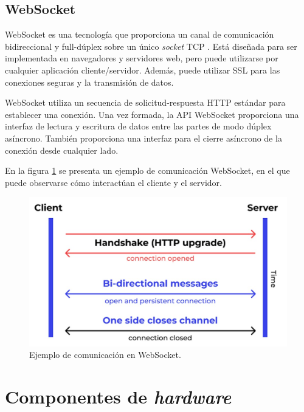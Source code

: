 \subsection{WebSocket}

WebSocket es una tecnología que proporciona un canal de comunicación bidireccional y full-dúplex \citep{WEBSITE:FULLDUPLEX} sobre un único \textit{socket} TCP \citep{WEBSITE:TCP}. Está diseñada para ser implementada en navegadores y servidores web, pero puede utilizarse por cualquier aplicación cliente/servidor. Además, puede utilizar SSL para las conexiones seguras y la transmisión de datos.

WebSocket utiliza un secuencia de solicitud-respuesta HTTP estándar para establecer una conexión. Una vez formada, la API WebSocket proporciona una interfaz de lectura y escritura de datos entre las partes de modo dúplex asíncrono. También proporciona una interfaz para el cierre asíncrono de la conexión desde cualquier lado.

En la figura \ref{fig:ejemploDeComunicacionEnWebSocket} se presenta un ejemplo de comunicación WebSocket, en el que puede observarse cómo interactúan el cliente y el servidor.

\begin{figure}[H]
	\centering
	\includegraphics[width=.9\textwidth]{./Figures/Ejemplo de comunicacion en WebSocket.jpg}
	\caption{Ejemplo de comunicación en WebSocket\protect\footnotemark.}
	\label{fig:ejemploDeComunicacionEnWebSocket}
\end{figure}


\section{Componentes de \emph{hardware}}

